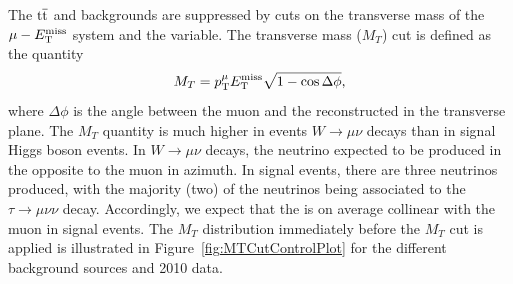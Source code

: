The $\mathrm{t}\overline{\mathrm{t}}$ and \WpJets backgrounds
are suppressed by cuts on the transverse mass of the $\mu-E_{\mathrm{T}}^{\text{miss}}$ system and the
\Pzeta variable.  The transverse mass ($M_T$) cut is defined as the quantity
\begin{equation}
  M_T = p_{\mathrm{T}}^\mu E_{\mathrm{T}}^{\text{miss}} \sqrt{1 - \cos \Delta\phi},
  \nonumber
\end{equation}
where $\Delta\phi$ is the angle between the muon and the reconstructed
\VMET in the transverse plane.  The $M_T$ quantity is much higher in
events $W \to \mu \nu$ decays than in signal Higgs boson events.  In $W \to \mu \nu$
decays, the neutrino expected to be produced in the opposite to the muon in
azimuth.  In signal events, there are three neutrinos produced, with the
majority (two) of the neutrinos being associated to the $\tau \to \mu \nu \nu$
decay.  Accordingly, we expect that the \VMET is on average collinear with the
muon in signal events.  The $M_T$ distribution immediately before the $M_T$ cut is applied
is illustrated in Figure~\ref{fig:MTCutControlPlot} for the different background
sources and 2010 data.
